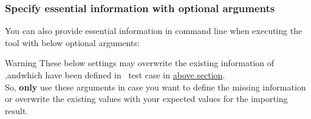     \hypertarget{optional-arguments}{%
    \subsubsection{Specify essential information with optional arguments}
    \label{optional-arguments}}
      You can also provide essential information in command line when executing the
      \href{https://github.com/test-fullautomation/robotframework-robotlog2db}
      {\pkg} tool with below optional arguments:

      \begin{boxwarning}{Warning}
        These below settings may overwrite the existing information of
        ,andwhich have been
        defined in \rfwcore\ test case in
        \hyperref[description-robotframework-testcase-settings]{above section}.
        \\
        So, \textbf{only} use these arguments in case you want to define the
        missing information or overwrite the existing values with your expected
        values for the importing result.
      \end{boxwarning}

